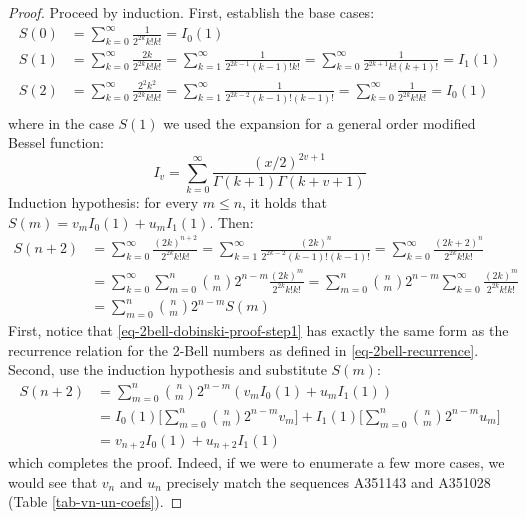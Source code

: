 \documentclass[a4paper]{amsart}
\begin{document}
\begin{proof}
Proceed by induction. First, establish the base cases:
\[
\begin{aligned}
S(0) &= \sum_{k=0}^{\infty} \frac{1}{2^{2k}k!k!} = I_0(1) \\
S(1) &= \sum_{k=0}^{\infty} \frac{2k}{2^{2k}k!k!} = \sum_{k=1}^{\infty} \frac{1}{2^{2k-1}(k-1)!k!} = \sum_{k=0}^{\infty} \frac{1}{2^{2k+1}k!(k+1)!} = I_1(1)\\
S(2) &= \sum_{k=0}^{\infty} \frac{2^2k^2}{2^{2k}k!k!} = \sum_{k=1}^{\infty} \frac{1}{2^{2k-2}(k-1)!(k-1)!} = \sum_{k=0}^{\infty} \frac{1}{2^{2k}k!k!} = I_0(1)\\
\end{aligned}
\]
where in the case $S(1)$ we used the expansion for a general order modified Bessel function:
\[
I_v = \sum_{k=0}^\infty \frac{(x/2)^{2v+1}}{\Gamma(k+1)\Gamma(k+v+1)}
\]
Induction hypothesis: for every $m \leq n$, it holds that $S(m) = v_m I_0(1) + u_m I_1(1)$. Then:
\begin{equation}\label{eq-2bell-dobinski-proof-step1}
\begin{aligned}
S(n+2) &= \sum_{k=0}^{\infty} \frac{(2k)^{n+2}}{2^{2k}k!k!} = \sum_{k=1}^{\infty} \frac{(2k)^{n}}{2^{2k-2}(k-1)!(k-1)!} = \sum_{k=0}^{\infty} \frac{(2k+2)^{n}}{2^{2k}k!k!}\\
&= \sum_{k=0}^{\infty}\sum_{m=0}^{n} \binom{n}{m}2^{n-m}\frac{(2k)^m}{2^{2k}k!k!} = \sum_{m=0}^{n}\binom{n}{m}2^{n-m} \sum_{k=0}^{\infty}\frac{(2k)^m}{2^{2k}k!k!} \\
&= \sum_{m=0}^{n}\binom{n}{m}2^{n-m} S(m)
\end{aligned}
\end{equation}
First, notice that \eqref{eq-2bell-dobinski-proof-step1} has exactly the same form as the recurrence relation for the 2-Bell numbers as defined in \eqref{eq-2bell-recurrence}. Second, use the induction hypothesis and substitute $S(m)$:
\[
\begin{aligned}
S(n+2) &= \sum_{m=0}^{n}\binom{n}{m}2^{n-m} (v_m I_0(1)+u_m I_1(1)) \\
&= I_0(1)\bigg[\sum_{m=0}^{n}\binom{n}{m}2^{n-m}v_m\bigg] + I_1(1)\bigg[\sum_{m=0}^{n}\binom{n}{m}2^{n-m}u_m\bigg] \\
&= v_{n+2}I_0(1)+u_{n+2}I_1(1)
\end{aligned}
\]
which completes the proof. Indeed, if we were to enumerate a few more cases, we would see that $v_n$ and $u_n$ precisely match the sequences A351143 and A351028 (Table \ref{tab-vn-un-coefs}).


\end{proof}
\end{document}

